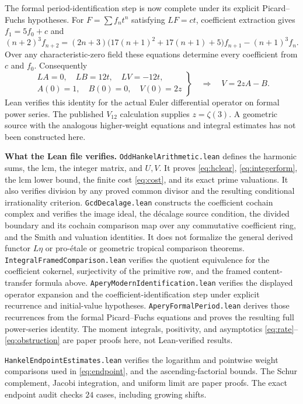 \documentclass[11pt]{article}
\begin{document}
The formal period-identification step is now complete under its explicit
Picard--Fuchs hypotheses. For $F=\sum f_nt^n$ satisfying $LF=ct$,
coefficient extraction gives $f_1=5f_0+c$ and
\[
 (n+2)^3f_{n+2}
 =(2n+3)\bigl(17(n+1)^2+17(n+1)+5\bigr)f_{n+1}
 -(n+1)^3f_n .
\]
Over any characteristic-zero field these equations determine every
coefficient from $c$ and $f_0$. Consequently
\[
 \left.
 \begin{gathered}
 LA=0,\quad LB=12t,\quad LV=-12t,\\
 A(0)=1,\quad B(0)=0,\quad V(0)=2z
 \end{gathered}
 \right\}
 \quad\Longrightarrow\quad V=2zA-B .
\]
Lean verifies this identity for the actual Euler differential operator
on formal power series. The published $V_{12}$ calculation supplies
$z=\zeta(3)$. A geometric source with the analogous higher-weight
equations and integral estimates has not been constructed here.

\medskip
\noindent\textbf{What the Lean file verifies.}
\texttt{OddHankelArithmetic.lean} defines the harmonic sums, the lcm,
the integer matrix, and $U,V$. It proves \eqref{eq:hclear},
\eqref{eq:integerform}, the lcm lower bound, the finite cost \eqref{eq:cost},
and its exact prime valuations. It also verifies division by any proved
common divisor and the resulting conditional irrationality criterion.
\texttt{GcdDecalage.lean} constructs the coefficient cochain complex and
verifies the image ideal, the d\'ecalage source condition, the divided
boundary and its cochain comparison map over any commutative coefficient ring,
and the Smith and valuation identities. It does not formalize the general derived functor $L\eta$ or
pro-\'etale or geometric tropical comparison theorems.
\texttt{IntegralFramedComparison.lean} verifies the quotient equivalence
for the coefficient cokernel, surjectivity of the primitive row, and the
framed content-transfer formula above.
\texttt{AperyModernIdentification.lean} verifies the displayed operator
expansion and the coefficient-identification step under explicit recurrence
and initial-value hypotheses.
\texttt{AperyFormalPeriod.lean} derives those recurrences from the formal
Picard--Fuchs equations and proves the resulting full power-series identity.
The moment integrals, positivity, and asymptotics
\eqref{eq:rate}--\eqref{eq:obstruction} are paper proofs here, not
Lean-verified results.

\noindent
\texttt{HankelEndpointEstimates.lean} verifies the logarithm and pointwise
weight comparisons used in \eqref{eq:endpoint}, and the ascending-factorial
bounds. The Schur complement, Jacobi integration, and uniform limit are
paper proofs. The exact endpoint audit checks $24$ cases, including growing shifts.
\end{document}
